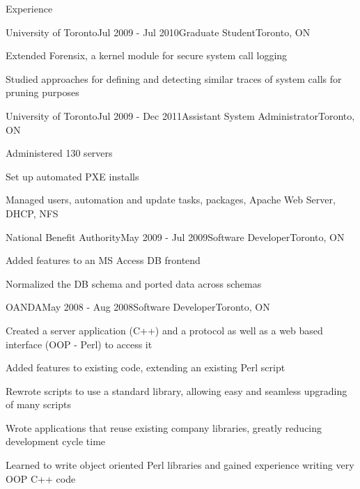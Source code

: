 \documentclass{resume}
\begin{document}
\begin{rSection}{Experience}
    \begin{rSubsection}{University of Toronto}{Jul 2009 - Jul 2010}{Graduate Student}{Toronto, ON}
      \item Extended Forensix, a kernel module for secure system call logging
      \item Studied approaches for defining and detecting similar traces of system calls for pruning purposes
    \end{rSubsection}

    \begin{rSubsection}{University of Toronto}{Jul 2009 - Dec 2011}{Assistant System Administrator}{Toronto, ON}
      \item Administered 130 servers
      \item Set up automated PXE installs
      \item Managed users, automation and update tasks, packages, Apache Web Server, DHCP, NFS
    \end{rSubsection}

    \begin{rSubsection}{National Benefit Authority}{May 2009 - Jul 2009}{Software Developer}{Toronto, ON}
      \item Added features to an MS Access DB frontend
      \item Normalized the DB schema and ported data across schemas
    \end{rSubsection}

    \begin{rSubsection}{OANDA}{May 2008 - Aug 2008}{Software Developer}{Toronto, ON}
      \item Created a server application (C++) and a protocol as well as a web based interface (OOP - Perl) to access it
      \item Added features to existing code, extending an existing Perl script 
      \item Rewrote scripts to use a standard library, allowing easy and seamless upgrading of many scripts
      \item Wrote applications that reuse existing company libraries, greatly reducing development cycle time
      \item Learned to write object oriented Perl libraries and gained experience writing very OOP C++ code
    \end{rSubsection}


\end{rSection}
\end{document}
